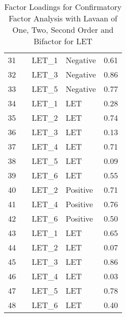 \documentclass{article}\usepackage[]{graphicx}\usepackage[]{color}
\begin{document}
\begin{table}[ht]
\begin{tabular}{rlllr}
  31 &  & LET\_1 & Negative & 0.61 \\ 
  32 &  & LET\_3 & Negative & 0.86 \\ 
  33 &  & LET\_5 & Negative & 0.77 \\ 
  34 &  & LET\_1 & LET & 0.28 \\ 
  35 &  & LET\_2 & LET & 0.74 \\ 
  36 &  & LET\_3 & LET & 0.13 \\ 
  37 &  & LET\_4 & LET & 0.71 \\ 
  38 &  & LET\_5 & LET & 0.09 \\ 
  39 &  & LET\_6 & LET & 0.55 \\ 
  40 &  & LET\_2 & Positive & 0.71 \\ 
  41 &  & LET\_4 & Positive & 0.76 \\ 
  42 &  & LET\_6 & Positive & 0.50 \\ 
  43 &  & LET\_1 & LET & 0.65 \\ 
  44 &  & LET\_2 & LET & 0.07 \\ 
  45 &  & LET\_3 & LET & 0.86 \\ 
  46 &  & LET\_4 & LET & 0.03 \\ 
  47 &  & LET\_5 & LET & 0.78 \\ 
  48 &  & LET\_6 & LET & 0.40 \\ 
   \hline
\end{tabular}
\caption{Factor Loadings for Confirmatory Factor Analysis with Lavaan of One, Two, Second Order and Bifactor for LET} 
\end{table}
\end{document}

